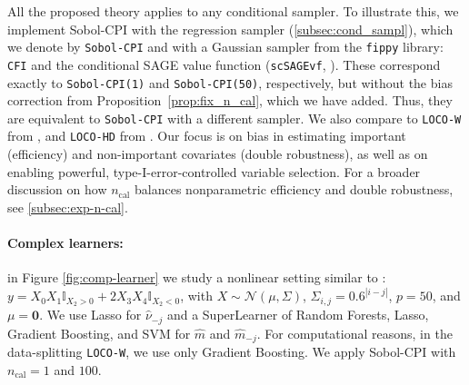 \documentclass{article}
\theoremstyle{plain}
\theoremstyle{definition}
\theoremstyle{remark}
\begin{document}

All the proposed theory applies to any conditional sampler. To illustrate this, we implement Sobol-CPI with the regression sampler (\ref{subsec:cond_sampl}), which we denote by \texttt{Sobol-CPI} and with a Gaussian sampler from the \texttt{fippy} library: \texttt{CFI} \cite{Strobl2008} and the conditional SAGE value function (\texttt{scSAGEvf}, \citet{covert}). These correspond exactly to \texttt{Sobol-CPI(1)} and \texttt{Sobol-CPI(50)}, respectively, but without the bias correction from Proposition~\ref{prop:fix_n_cal}, which we have added. Thus, they are equivalent to \texttt{Sobol-CPI} with a different sampler.  We also compare to \texttt{LOCO-W} from \citet{williamson2023general}, and \texttt{LOCO-HD} from \citet{locoVSShapley}. Our focus is on bias in estimating important (efficiency) and non-important covariates (double robustness), as well as on enabling powerful, type-I-error-controlled variable selection. For a broader discussion on how $n_\mathrm{cal}$ balances nonparametric efficiency and double robustness, see \cref{subsec:exp-n-cal}.

%
\paragraph{Complex learners:} in Figure \ref{fig:comp-learner} we study a nonlinear setting similar to \citet{scornet2022mda}: $ y = X_0 X_1 \mathbb{I}_{X_2 > 0} + 2 X_3 X_4 \mathbb{I}_{X_2 < 0} $, with $X \sim \mathcal{N}(\mu, \Sigma) $, $ \Sigma_{i,j} = 0.6^{|i-j|}$, $p = 50 $, and $\mu = \mathbf{0}$. 
%
We use Lasso for $\widehat{\nu}_{-j}$ and a SuperLearner \cite{van2007super} of Random Forests, Lasso, Gradient Boosting, and SVM for $\widehat{m}$ and $\widehat{m}_{-j}$. 
%
For computational reasons, in the data-splitting \texttt{LOCO-W}, we use only Gradient Boosting. We apply Sobol-CPI with $n_\mathrm{cal}=1$ and $100$.
\end{document}
